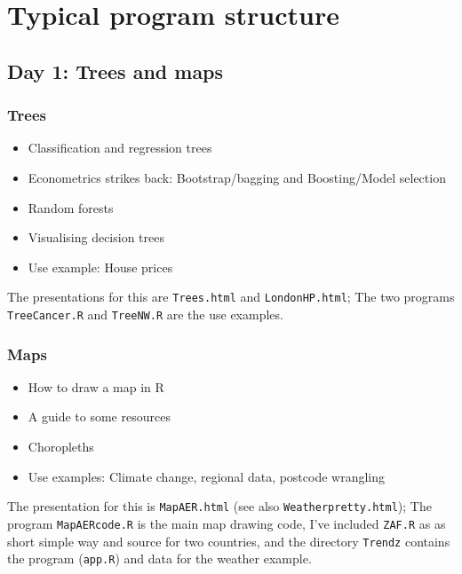 \documentclass[
  letterpaper,
]{book}
\providecommand{\tightlist}{%
  \setlength{\itemsep}{0pt}\setlength{\parskip}{0pt}}\usepackage{longtable,booktabs,array}
\begin{document}
\hypertarget{typical-program-structure}{%
\section{Typical program structure}\label{typical-program-structure}}

\hypertarget{day-1-trees-and-maps}{%
\subsection{Day 1: Trees and maps}\label{day-1-trees-and-maps}}

\hypertarget{trees}{%
\subsubsection{Trees}\label{trees}}

\begin{itemize}
\tightlist
\item
  Classification and regression trees
\item
  Econometrics strikes back: Bootstrap/bagging and Boosting/Model
  selection
\item
  Random forests
\item
  Visualising decision trees
\item
  Use example: House prices
\end{itemize}

The presentations for this are \texttt{Trees.html} and
\texttt{LondonHP.html}; The two programs \texttt{TreeCancer.R} and
\texttt{TreeNW.R} are the use examples.

\hypertarget{maps}{%
\subsubsection{Maps}\label{maps}}

\begin{itemize}
\tightlist
\item
  How to draw a map in R
\item
  A guide to some resources
\item
  Choropleths
\item
  Use examples: Climate change, regional data, postcode wrangling
\end{itemize}

The presentation for this is \texttt{MapAER.html} (see also
\texttt{Weatherpretty.html}); The program \texttt{MapAERcode.R} is the
main map drawing code, I've included \texttt{ZAF.R} as as short simple
way and source for two countries, and the directory \texttt{Trendz}
contains the program (\texttt{app.R}) and data for the weather example.
\end{document}

